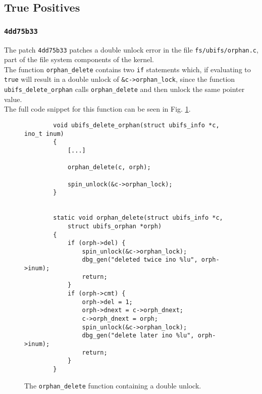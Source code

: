 \subsection{True Positives}

\subsubsection{\texttt{4dd75b33}}

\noindent The patch \texttt{4dd75b33} patches a double unlock error in the file \texttt{fs/ubifs/orphan.c}, part of the file system components of the kernel.
\\

\noindent The function \texttt{orphan\_delete} contains two \texttt{if} statements which, if evaluating to \texttt{true} will result in a double unlock of \texttt{\&c->orphan\_lock}, since the function \texttt{ubifs\_delete\_orphan} calls \texttt{orphan\_delete} and then unlock the same pointer value. 
\\

\noindent The full code snippet for this function can be seen in Fig. \ref{fig:orphan.c}.
\\

\begin{figure}[h]
    \centering
    \begin{verbatim}
        void ubifs_delete_orphan(struct ubifs_info *c, ino_t inum)
        {
            [...]
            
            orphan_delete(c, orph);

            spin_unlock(&c->orphan_lock);
        }


        static void orphan_delete(struct ubifs_info *c, 
            struct ubifs_orphan *orph)
        {
            if (orph->del) {
                spin_unlock(&c->orphan_lock);
                dbg_gen("deleted twice ino %lu", orph->inum);
                return;
            }
            if (orph->cmt) {
                orph->del = 1;
                orph->dnext = c->orph_dnext;
                c->orph_dnext = orph;
                spin_unlock(&c->orphan_lock);
                dbg_gen("delete later ino %lu", orph->inum);
                return;
            }
        }
    \end{verbatim}
    \caption{The \texttt{orphan\_delete} function containing a double unlock.}
    \label{fig:orphan.c}
\end{figure}